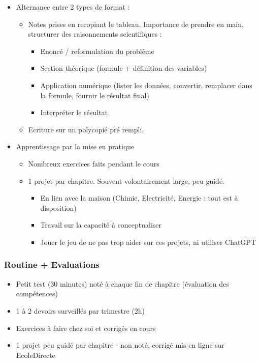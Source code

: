 \documentclass[a4paper,12pt]{article}
\begin{document}
\begin{itemize}[noitemsep]
  \item Alternance entre 2 types de format :
    \begin{itemize}[noitemsep]
      \item Notes prises en recopiant le tableau. Importance de prendre en main, structurer des raisonnements scientifiques : 
      \begin{itemize}[noitemsep]
        \item Enoncé / reformulation du problème
        \item Section théorique (formule + définition des variables)
        \item Application numérique (lister les données, convertir, remplacer dans la formule, fournir le résultat final)
        \item Interpréter le résultat
      \end{itemize}
      \item Ecriture sur un polycopié pré rempli.
    \end{itemize}
  \item Apprentissage par la mise en pratique
    \begin{itemize}[noitemsep]
      \item Nombreux exercices faits pendant le cours
      \item 1 projet par chapitre. Souvent volontairement large, peu guidé.
        \begin{itemize}[noitemsep]
          \item En lien avec la maison (Chimie, Electricité, Energie : tout est à disposition)
          \item Travail sur la capacité à conceptualiser
          \item Jouer le jeu de ne pas trop aider sur ces projets, ni utiliser ChatGPT
        \end{itemize}
    \end{itemize}
  \end{itemize}
  

\subsubsection*{Routine + Evaluations}

\begin{itemize}[noitemsep]
  \item Petit test (30 minutes) noté à chaque fin de chapitre (évaluation des compétences)
  \item 1 à 2 devoirs surveillés par trimestre (2h)
  \item Exercices à faire chez soi et corrigés en cours
  \item 1 projet peu guidé par chapitre - non noté, corrigé mis en ligne sur EcoleDirecte 
\end{itemize}
\end{document}
